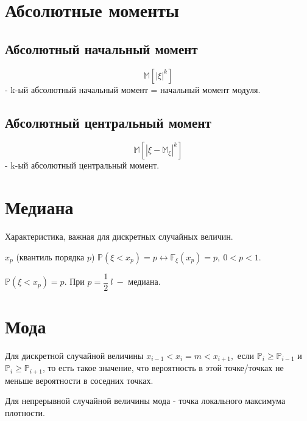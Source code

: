 \documentclass[../Main.tex]{subfiles}
\begin{document}
\section{Абсолютные моменты}
\subsection{Абсолютный начальный момент}

\[\mathbb{M}[|\xi|^k]\] - k-ый абсолютный начальный момент = начальный момент модуля.

\subsection{Абсолютный центральный момент}

\[\mathbb{M}[|\xi - \mathbb{M}_\xi|^k]\] - k-ый абсолютный центральный момент.

\section{Медиана}

Характеристика, важная для дискретных случайных величин.



\(x_p\) (квантиль порядка \(p\)) \Rightarrow \(\mathbb{P}(\xi < x_p) = p \leftrightarrow \mathbb{F}_\xi(x_p) = p,\ 0<p<1\).

\(\mathbb{P}(\xi < x_p) = p\). При \(p = \dfrac{1}{2}\ l \ -\) медиана.

\section{Мода}


Для дискретной случайной величины \(x_{i-1}<x_i=m<x_{i+1}, \) если \(\mathbb{P}_i \geq \mathbb{P}_{i-1}\) и \(\mathbb{P}_i \geq \mathbb{P}_{i+1}\), то есть такое значение, что вероятность в этой точке/точках не меньше вероятности в соседних точках.

Для непрерывной случайной величины мода - точка локального максимума плотности.
\end{document}
